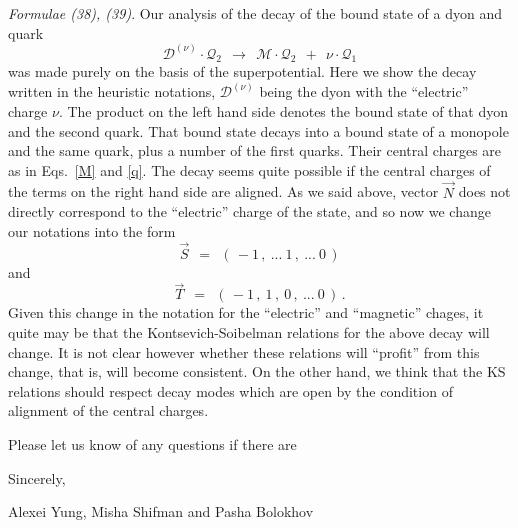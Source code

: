 \documentclass[epsfig,12pt]{article}
\def\beq{\begin{equation}}
\def\eeq{\end{equation}}
\def\beq{\begin{equation}}
\def\eeq{\end{equation}}
\newcommand{\mc}[1]{\mathcal{#1}}
\begin{document}
\vspace{0.8cm}
	{\it Formulae (38), (39)}.
	Our analysis of the decay of the bound state of a dyon and quark 
\beq
	\mc{D}^{(\nu)} \!\cdot\! \mc{Q}_2 ~~\to~~ \mc{M} \!\cdot\! \mc{Q}_2  ~~+~~ \nu \cdot \mc{Q}_1
\eeq
	was made purely on the basis of the superpotential.
	Here we show the decay written in the heuristic notations, $ \mc{D}^{(\nu)} $ being the dyon
	with the ``electric'' charge $ \nu $.
	The product on the left hand side denotes the bound state of that dyon and the second quark.
	That bound state decays into a bound state of a monopole and the same quark, plus a number of
	the first quarks.
	Their central charges are as in Eqs.~\eqref{M} and \eqref{q}.
	The decay seems quite possible if the central charges of the terms on the right 
	hand side are aligned.
	As we said above, vector $ \vec{N} $ does not directly correspond to the ``electric'' charge
	of the state, and so now we change our notations into the form
\beq
	\vec{S} ~~=~~ (\, -1\,,~...~ 1\,,~ ... ~0\, )
\eeq
	and
\beq
	\vec{T} ~~=~~ (\, -1\,, ~1\,, ~0\,,~ ... ~0\, )\,.
\eeq
	Given this change in the notation for the ``electric'' and ``magnetic'' chages,
	it quite may be that the Kontsevich-Soibelman relations for the above decay will change.
	It is not clear however whether these relations will ``profit'' from this change,
	that is, will become consistent.
	On the other hand, we think that the KS relations should respect decay modes which
	are open by the condition of alignment of the central charges.

\vspace{1.0cm}
	\hspace{0.9cm}Please let us know of any questions if there are

\vspace{0.8cm}
	\hspace{0.3cm}Sincerely,

\vspace{0.7cm}
	\hspace{-0.7cm}
	Alexei Yung, Misha Shifman and Pasha Bolokhov
\end{document}
